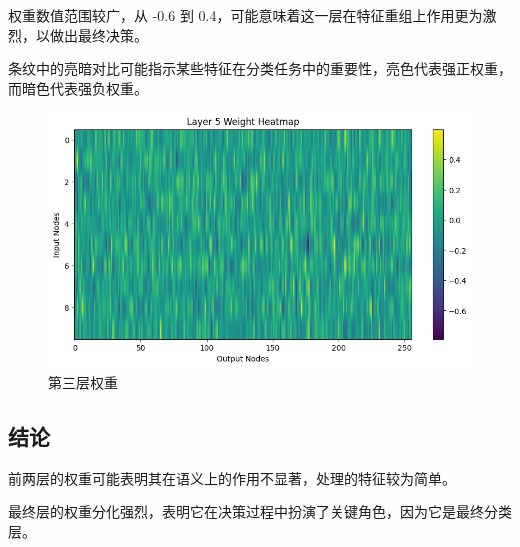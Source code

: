 \documentclass[a4paper,12pt]{article}
\begin{document}
权重数值范围较广，从 -0.6 到 0.4，可能意味着这一层在特征重组上作用更为激烈，以做出最终决策。

条纹中的亮暗对比可能指示某些特征在分类任务中的重要性，亮色代表强正权重，而暗色代表强负权重。


\begin{figure}[H]
    \centering
    \includegraphics[width=1\textwidth]{layer3.png}
    \caption{第三层权重}
    \label{fig:example}
\end{figure}



\subsection{结论}

前两层的权重可能表明其在语义上的作用不显著，处理的特征较为简单。

最终层的权重分化强烈，表明它在决策过程中扮演了关键角色，因为它是最终分类层。
\end{document}
